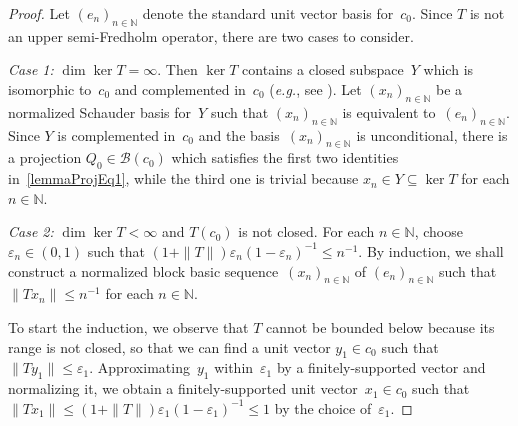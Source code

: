 \documentclass[12pt]{amsart}
\theoremstyle{definition}
\numberwithin{equation}{section}
\begin{document}
\begin{proof} Let $(e_n)_{n\in{\ensuremath{\mathbb{N}}}}$ denote the standard unit vector
  basis for~$c_0$.  Since $T$ is not an upper semi-Fredholm operator,
  there are two cases to consider.

  \emph{Case 1:} $\dim\ker T = \infty$. Then $\ker T$ contains a
  closed subspace~$Y$ which is isomorphic to~$c_0$ and complemented
  in~$c_0$ (\emph{e.g.}, see \cite[Proposition~2.a.2]{lt1}).  Let
  $(x_n)_{n\in{\ensuremath{\mathbb{N}}}}$ be a normalized Schauder basis for~$Y$ such that
  $(x_n)_{n\in{\ensuremath{\mathbb{N}}}}$ is equivalent to~$(e_n)_{n\in{\ensuremath{\mathbb{N}}}}$.  Since $Y$ is
  complemented in~$c_0$ and the basis~$(x_n)_{n\in{\ensuremath{\mathbb{N}}}}$ is
  unconditional, there is a projection $Q_0\in\mathscr{B}(c_0)$ which
  satisfies the first two identities in~\eqref{lemmaProjEq1}, while
  the third one is trivial because $x_n\in Y\subseteq\ker T$ for each
  $n\in{\ensuremath{\mathbb{N}}}$.

  \emph{Case 2:} $\dim\ker T < \infty$ and $T(c_0)$ is not closed.
  For each $n\in{\ensuremath{\mathbb{N}}}$, choose ${\ensuremath{\varepsilon}}_n\in(0,1)$ such that
  $(1+\|T\|){\ensuremath{\varepsilon}}_n(1-{\ensuremath{\varepsilon}}_n)^{-1}{\ensuremath{\leqslant}} n^{-1}$.  By induction,
  we shall construct a normalized block basic
  sequence~$(x_n)_{n\in{\ensuremath{\mathbb{N}}}}$ of $(e_n)_{n\in{\ensuremath{\mathbb{N}}}}$ such that $\|
  Tx_n\|{\ensuremath{\leqslant}} n^{-1}$ for each $n\in{\ensuremath{\mathbb{N}}}$.

  To start the induction, we observe that $T$ cannot be bounded below
  because its range is not closed, so that we can find a unit vector
  $y_1\in c_0$ such that $\|Ty_1\|{\ensuremath{\leqslant}}{\ensuremath{\varepsilon}}_1$. Approximating~$y_1$
  within~${\ensuremath{\varepsilon}}_1$ by a finitely-supported vector and normalizing
  it, we obtain a finitely-supported unit vector~$x_1\in c_0$ such
  that $\| Tx_1\|{\ensuremath{\leqslant}} (1+\|T\|){\ensuremath{\varepsilon}}_1(1-{\ensuremath{\varepsilon}}_1)^{-1}{\ensuremath{\leqslant}} 1$ by
  the choice of~${\ensuremath{\varepsilon}}_1$.


\end{proof}
\end{document}
